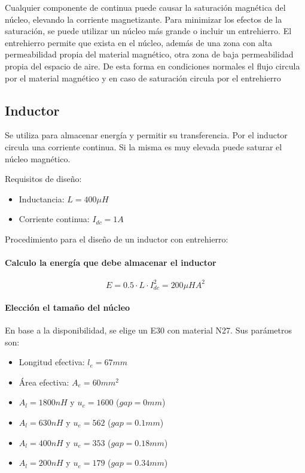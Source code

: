 Cualquier componente de continua puede causar la saturación magnética del núcleo, 
elevando la corriente magnetizante. 
Para minimizar los efectos de la saturación, se puede utilizar un núcleo más grande o incluir un entrehierro.
El entrehierro permite que exista en el núcleo, además de una zona con alta permeabilidad propia del material magnético, 
otra zona de baja permeabilidad propia del espacio de aire. 
De esta forma en condiciones normales el flujo circula por el material magnético y en caso de saturación circula por el entrehierro 

\subsection{Inductor}

Se utiliza para almacenar energía y permitir su transferencia. 
Por el inductor circula una corriente continua. Si la misma es muy elevada puede saturar el núcleo magnético. 

Requisitos de diseño: 

\begin{itemize}
    \item Inductancia: $L=400\mu H$
    \item Corriente continua: $I_{dc}=1A$
\end{itemize}

Procedimiento para el diseño de un inductor con entrehierro:

\paragraph{Calculo la energía que debe almacenar el inductor}
$$ E=0.5\cdot L\cdot I_{dc}^2=200\mu HA^2 $$
\paragraph{Elección el tamaño del núcleo}
En base a la disponibilidad, se elige un E30 con material N27. 
Sus parámetros son:
\begin{itemize}
    \item Longitud efectiva: $l_e=67mm$
    \item Área efectiva: $A_e=60{mm}^2$
    \item $A_l=1800nH$ y $u_e=1600$ ($gap=0mm$)
    \item $A_l=630nH$ y $u_e=562$ ($gap=0.1mm$)
    \item $A_l=400nH$ y $u_e=353$ ($gap=0.18mm$)
    \item $A_l=200nH$ y $u_e=179$ ($gap=0.34mm$)
\end{itemize}


